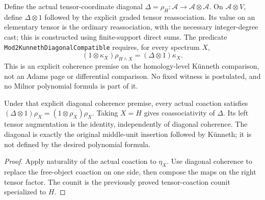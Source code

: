 \begin{definition}
  \label{def:h6-kunneth-diagonal-input}
  \leanok
  Define the actual tensor-coordinate diagonal
  $\Delta=\rho_H:\mathcal A\to\mathcal A\otimes\mathcal A$.
  On $\mathcal A\otimes V$, define $\Delta\otimes1$ followed by the
  explicit graded tensor reassociation. Its value on an elementary
  tensor is the ordinary reassociation, with the necessary integer-degree
  cast; this is constructed using finite-support direct sums.
  The predicate \texttt{Mod2KunnethDiagonalCompatible} requires, for every
  spectrum $X$,
  \[
    (1\otimes\kappa_X)\rho_{H\wedge X}
        =(\Delta\otimes1)\kappa_X.
  \]
  This is an explicit coherence premise on the homology-level K\"unneth
  comparison, not an Adams page or differential comparison. No fixed
  witness is postulated, and no Milnor polynomial formula is part of it.
\end{definition}

\begin{proposition}
  \label{prop:h6-tensor-coaction-coassoc}
  \leanok
  Under that explicit diagonal coherence premise, every actual coaction
  satisfies $(\Delta\otimes1)\rho_X=(1\otimes\rho_X)\rho_X$.
  Taking $X=H$ gives coassociativity of $\Delta$. Its left tensor
  augmentation is the identity, independently of diagonal coherence.
  The diagonal is exactly the original middle-unit insertion followed
  by K\"unneth; it is not defined by the desired polynomial formula.
\end{proposition}
\begin{proof}
  Apply naturality of the actual coaction to $\eta_X$. Use diagonal
  coherence to replace the free-object coaction on one side, then compose
  the maps on the right tensor factor. The counit is the previously
  proved tensor-coaction counit specialized to $H$.
  \leanok
\end{proof}

